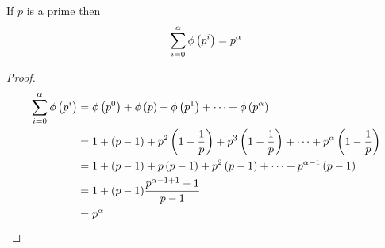\documentclass[12pt]{book}
\begin{document}
\begin{thm}
    If $ p $ is a prime then 
    \[\sum_{i=0}^\alpha \phi\left( p^i \right)=p^\alpha\]
\end{thm}
\begin{proof}
    \hfill
    \begin{align*}
        \sum_{i=0}^\alpha \phi\left( p^i \right)&=\phi\left( p^0 \right)+\phi\left( p \right)+\phi\left( p^1 \right)+\dots+\phi\left( p^\alpha \right)\\
        &=1+(p-1)+p^2\left( 1-\frac{1}{p} \right)+p^3\left( 1-\frac{1}{p} \right)+\dots+p^\alpha\left( 1-\frac{1}{p} \right)\\
        &=1+(p-1)+p\left( p-1\right)+p^2\left( p-1\right)+\dots+p^{\alpha-1}\left( p-1\right)\\
        &=1+(p-1)\frac{p^{\alpha-1+1}-1}{p-1}\\
        &=p^\alpha
    \end{align*}
\end{proof}
\end{document}
